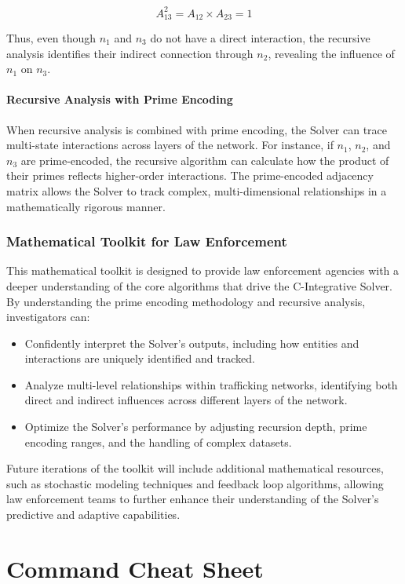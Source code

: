 \documentclass[%
 preprint, linenumbers,
 amsmath,amssymb,
 aps, physrev,
]{revtex4-2}
\begin{document}
\[
A^2_{13} = A_{12} \times A_{23} = 1
\]

Thus, even though \( n_1 \) and \( n_3 \) do not have a direct interaction, the recursive analysis identifies their indirect connection through \( n_2 \), revealing the influence of \( n_1 \) on \( n_3 \).

\paragraph{Recursive Analysis with Prime Encoding}
When recursive analysis is combined with prime encoding, the Solver can trace multi-state interactions across layers of the network. For instance, if \( n_1 \), \( n_2 \), and \( n_3 \) are prime-encoded, the recursive algorithm can calculate how the product of their primes reflects higher-order interactions. The prime-encoded adjacency matrix allows the Solver to track complex, multi-dimensional relationships in a mathematically rigorous manner.

\subsubsection*{Mathematical Toolkit for Law Enforcement}

This mathematical toolkit is designed to provide law enforcement agencies with a deeper understanding of the core algorithms that drive the C-Integrative Solver. By understanding the prime encoding methodology and recursive analysis, investigators can:
\begin{itemize}
    \item Confidently interpret the Solver's outputs, including how entities and interactions are uniquely identified and tracked.
    \item Analyze multi-level relationships within trafficking networks, identifying both direct and indirect influences across different layers of the network.
    \item Optimize the Solver’s performance by adjusting recursion depth, prime encoding ranges, and the handling of complex datasets.
\end{itemize}

Future iterations of the toolkit will include additional mathematical resources, such as stochastic modeling techniques and feedback loop algorithms, allowing law enforcement teams to further enhance their understanding of the Solver's predictive and adaptive capabilities.

\section*{Command Cheat Sheet}
\end{document}

